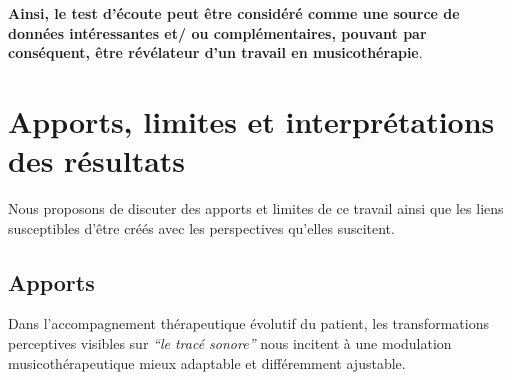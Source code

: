   \textbf{ Ainsi, le test
  d'écoute peut être considéré comme une source de données
   intéressantes et/ ou complémentaires, pouvant par conséquent, être
  \textbf{révélateur d'un
  travail en musicothérapie}}.





\section{Apports, limites et interprétations des résultats }
Nous proposons de discuter des apports et limites de ce travail ainsi que les liens susceptibles d'être créés avec les perspectives qu'elles suscitent.
\subsection{Apports}
Dans l'accompagnement thérapeutique évolutif du patient,
 les transformations perceptives visibles sur
\textit{``le tracé sonore''} nous incitent à une modulation
musicothérapeutique mieux adaptable et différemment ajustable.


